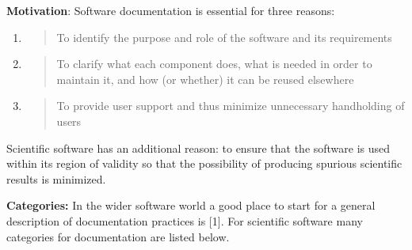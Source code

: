 \documentclass[]{article}
\date{}
\begin{document}
\pagestyle{fancy}
  \renewcommand{\headrulewidth}{0pt}
  

\thispagestyle{empty}

\textbf{\newline Motivation}: Software
documentation is essential for three
reasons:

\begin{enumerate}
\def\labelenumi{(\arabic{enumi})}
\item
  \begin{quote}
  To identify the purpose and role of the software and its requirements
  \end{quote}
\item
  \begin{quote}
  To clarify what each component does, what is needed in order to
  maintain it, and how (or whether) it can be reused elsewhere
  \end{quote}
\item
  \begin{quote}
  To provide user support and thus minimize unnecessary handholding of
  users
  \end{quote}
\end{enumerate}

Scientific software has an additional reason: to ensure that the
software is used within its region of validity so that the possibility
of producing spurious scientific results is minimized.

\textbf{Categories:} In the wider
software world a good place to start for a general description of
documentation practices is {[}1{]}. For scientific software many
categories for documentation are listed
below.
\end{document}
